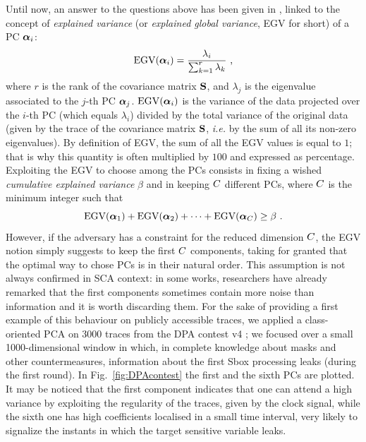 Until now, an answer to the questions above has been given in \cite{choudary2014efficient}, linked to the concept of {\em explained variance} (or {\em explained global variance}, EGV for short) of a PC $\boldsymbol{\alpha}_i$:
\begin{equation}\label{eq:EGV}
\mathrm{EGV}(\boldsymbol{\alpha}_i) =  \frac{\lambda_i}{\sum_{k=1}^r\lambda_k} \mbox{ ,}
\end{equation}
where $r$ is the rank of the covariance matrix $\textbf{S}$, and $\lambda_j$ is the eigenvalue associated to the $j$-th PC $\boldsymbol{\alpha}_j$. $\mathrm{EGV}(\boldsymbol{\alpha}_i)$ is the variance of the data projected over the $i$-th PC (which equals $\lambda_i$) divided by the total variance of the original data (given by the trace of the covariance matrix $\textbf{S}$, {\em i.e.} by the sum of all its non-zero eigenvalues). By definition of EGV, the sum of all the EGV values is equal to $1$; that is why this quantity is often multiplied by $100$ and expressed as percentage.
Exploiting the EGV to choose among the PCs consists in fixing a wished {\em cumulative explained variance} $\beta$ and in keeping $C$ different PCs, where $C$ is the minimum integer such that
\begin{equation}
\mbox{EGV}(\boldsymbol{\alpha}_1) +\mbox{EGV}(\boldsymbol{\alpha}_2) + \dots +\mbox{EGV}(\boldsymbol{\alpha}_C) \geq \beta \mbox{ .}
\end{equation}
However, if the adversary has a constraint for the reduced dimension $C$, the EGV notion simply suggests to keep the first $C$ components, taking for granted that the optimal way to chose PCs is in their natural order. This assumption is not always confirmed in SCA context: in some works, researchers have already remarked that the first components sometimes contain more noise than information \cite{Batina2012,specht} and it is worth discarding them. For the sake of providing a first example of this behaviour on publicly accessible traces, we applied a class-oriented PCA on 3000 traces from the DPA contest v4 \cite{DPAcontest}; we focused over a small 1000-dimensional window in which, in complete knowledge about masks and other countermeasures, information about the first Sbox processing leaks (during the first round). In Fig.~\ref{fig:DPAcontest} the first and the sixth PCs are plotted. It may be noticed that the first component indicates that one can attend a high variance by exploiting the regularity of the traces, given by the clock signal, while the sixth one has high coefficients localised in a small time interval, very likely to signalize the instants in which the target sensitive variable leaks.

